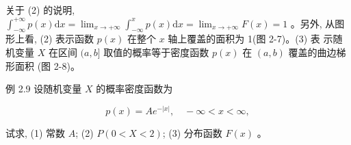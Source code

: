 \documentclass{beamer}
\begin{document}
	\begin{frame}
		关于 (2) 的说明, $\int_{-\infty}^{+\infty} p(x) \mathrm{d} x=\lim _{x \rightarrow+\infty} \int_{-\infty}^{x} p(x) \mathrm{d} x=\lim _{x \rightarrow+\infty} F(x)=1$ 。另外, 从图形上看, (2) 表示函数 $p(x)$ 在整个 $x$ 轴上覆盖的面积为 1(图 2-7)。(3) 表 示随机变量 $X$ 在区间 $(a, b]$ 取值的概率等于密度函数 $p(x)$ 在 $(a, b)$ 覆盖的曲边梯形面积 (图 2-8)。
		\begin{figure}[htp]
			\centering
			\hfill%
		\end{figure}
	\end{frame}
	
	\begin{frame}
		例 2.9 设随机变量 $X$ 的概率密度函数为
		
		$$
		p(x)=A e^{-|x|}, \quad-\infty<x<\infty,
		$$
		
		试求, (1) 常数 $A$; (2) $P(0<X<2)$; (3) 分布函数 $F(x)$ 。
	\end{frame}
	
\end{document}
